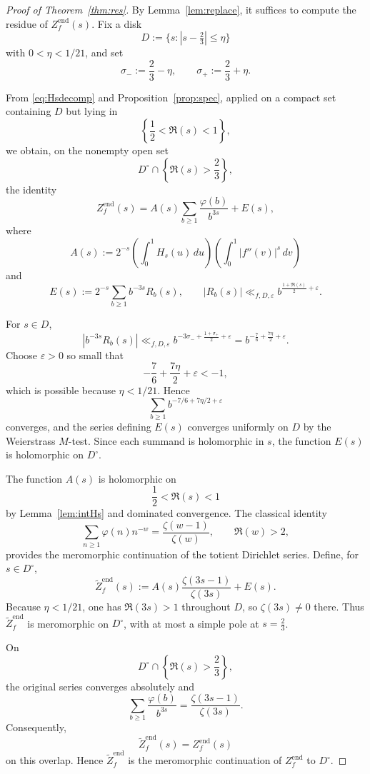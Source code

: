 \documentclass[a4paper,american,11pt]{amsart}
\theoremstyle{plain}
\theoremstyle{definition}
\begin{document}
\begin{proof}[Proof of Theorem~\ref{thm:res}]
\label{proof:thm:res}
By Lemma~\ref{lem:replace}, it suffices to compute the residue of
\(Z_f^{\mathrm{end}}(s)\). Fix a disk
\[
D:=\{s:|s-\tfrac23|\le \eta\}
\]
with \(0<\eta<1/21\), and set
\[
\sigma_-:=\frac23-\eta,
\qquad
\sigma_+:=\frac23+\eta.
\]

From \eqref{eq:Hsdecomp} and Proposition~\ref{prop:spec}, applied on a
compact set containing \(D\) but lying in
\[
\left\{\frac12<\Re(s)<1\right\},
\]
we obtain, on the nonempty open set
\[
D^\circ\cap\left\{\Re(s)>\frac23\right\},
\]
the identity
\[
Z_f^{\mathrm{end}}(s)
=
A(s)\sum_{b\ge1}\frac{\varphi(b)}{b^{3s}}
+
E(s),
\]
where
\[
A(s):=
2^{-s}
\left(\int_0^1 H_s(u)\,du\right)
\left(\int_0^1 |f''(v)|^s\,dv\right)
\]
and
\[
E(s):=
2^{-s}\sum_{b\ge1}b^{-3s}R_b(s),
\qquad
|R_b(s)|
\ll_{f,D,\varepsilon}
b^{\frac{1+\Re(s)}{2}+\varepsilon}.
\]

For \(s\in D\),
\[
|b^{-3s}R_b(s)|
\ll_{f,D,\varepsilon}
b^{-3\sigma_-+\frac{1+\sigma_+}{2}+\varepsilon}
=
b^{-\frac76+\frac{7\eta}{2}+\varepsilon}.
\]
Choose \(\varepsilon>0\) so small that
\[
-\frac76+\frac{7\eta}{2}+\varepsilon<-1,
\]
which is possible because \(\eta<1/21\). Hence
\[
\sum_{b\ge1}b^{-7/6+7\eta/2+\varepsilon}
\]
converges, and the series defining \(E(s)\) converges uniformly on \(D\)
by the Weierstrass \(M\)-test. Since each summand is holomorphic in \(s\),
the function \(E(s)\) is holomorphic on \(D^\circ\).

The function \(A(s)\) is holomorphic on
\[
\frac12<\Re(s)<1
\]
by Lemma~\ref{lem:intHs} and dominated convergence. The classical identity
\[
\sum_{n\ge1}\varphi(n)n^{-w}
=
\frac{\zeta(w-1)}{\zeta(w)},
\qquad
\Re(w)>2,
\]
provides the meromorphic continuation of the totient Dirichlet series.
Define, for \(s\in D^\circ\),
\[
\widetilde Z_f^{\mathrm{end}}(s)
:=
A(s)\frac{\zeta(3s-1)}{\zeta(3s)}
+
E(s).
\]
Because \(\eta<1/21\), one has \(\Re(3s)>1\) throughout \(D\), so
\(\zeta(3s)\neq0\) there. Thus
\(\widetilde Z_f^{\mathrm{end}}\) is meromorphic on \(D^\circ\), with at
most a simple pole at \(s=\frac23\).

On
\[
D^\circ\cap\left\{\Re(s)>\frac23\right\},
\]
the original series converges absolutely and
\[
\sum_{b\ge1}\frac{\varphi(b)}{b^{3s}}
=
\frac{\zeta(3s-1)}{\zeta(3s)}.
\]
Consequently,
\[
\widetilde Z_f^{\mathrm{end}}(s)
=
Z_f^{\mathrm{end}}(s)
\]
on this overlap. Hence \(\widetilde Z_f^{\mathrm{end}}\) is the meromorphic
continuation of \(Z_f^{\mathrm{end}}\) to \(D^\circ\).


\end{proof}
\end{document}
